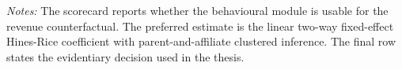 \begin{table}[H]
\vspace{0.5em}
\begin{minipage}{0.96\textwidth}
\footnotesize\raggedright \textit{Notes:} The scorecard reports whether the behavioural module is usable for the revenue counterfactual. The preferred estimate is the linear two-way fixed-effect Hines-Rice coefficient with parent-and-affiliate clustered inference. The final row states the evidentiary decision used in the thesis.
\end{minipage}
\end{table}
